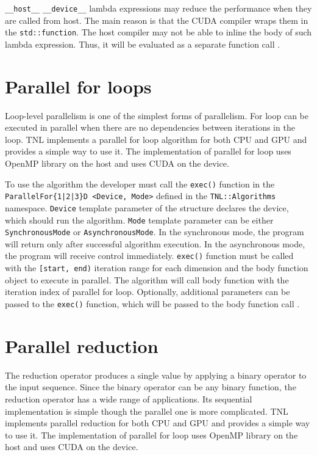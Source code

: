 \texttt{\_\_host\_\_} \texttt{\_\_device\_\_} lambda expressions may reduce the performance when they are called from host.
The main reason is that the CUDA compiler wraps them in the \texttt{std::function}.
The host compiler may not be able to inline the body of such lambda expression.
Thus, it will be evaluated as a separate function call \cite{CUDA8}.

\section{Parallel for loops}

Loop-level parallelism is one of the simplest forms of parallelism.
For loop can be executed in parallel when there are no dependencies between iterations in the loop.
TNL implements a parallel for loop algorithm for both CPU and GPU and provides a simple way to use it.
The implementation of parallel for loop uses OpenMP library on the host and uses CUDA on the device.

To use the algorithm the developer must call the \texttt{exec()} function in the \texttt{ParallelFor\{1|2|3\}D <Device, Mode>} defined in the \texttt{TNL::Algorithms} namespace.
\texttt{Device} template parameter of the structure declares the device, which should run the algorithm.
\texttt{Mode} template parameter can be either \texttt{SynchronousMode} or \texttt{AsynchronousMode}.
In the synchronous mode, the program will return only after successful algorithm execution.
In the asynchronous mode, the program will receive control immediately.
\texttt{exec()} function must be called with the \texttt{[start, end)} iteration range for each dimension and the body function object to execute in parallel.
The algorithm will call body function with the iteration index of parallel for loop.
Optionally, additional parameters can be passed to the \texttt{exec()} function, which will be passed to the body function call \cite{TNLForLoop}.

\newpage

\section{Parallel reduction}

The reduction operator produces a single value by applying a binary operator to the input sequence.
Since the binary operator can be any binary function, the reduction operator has a wide range of applications.
Its sequential implementation is simple though the parallel one is more complicated.
TNL implements parallel reduction for both CPU and GPU and provides a simple way to use it.
The implementation of parallel for loop uses OpenMP library on the host and uses CUDA on the device.

